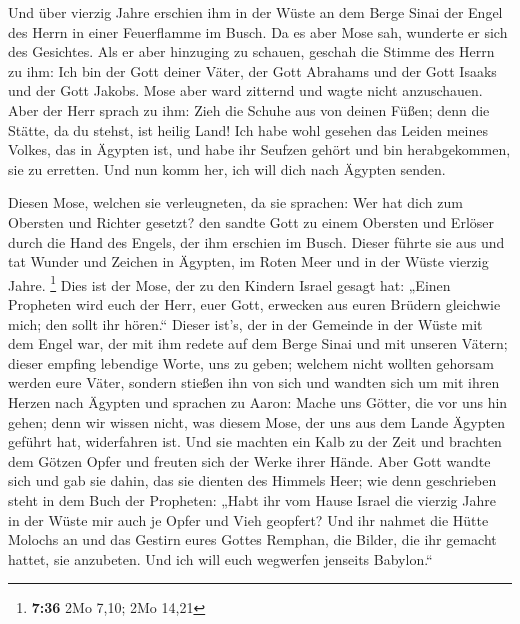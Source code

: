  Und über vierzig Jahre erschien ihm in der Wüste an dem
Berge Sinai der Engel des Herrn in einer Feuerflamme im Busch.
 Da es aber Mose sah, wunderte er sich des Gesichtes. Als
er aber hinzuging zu schauen, geschah die Stimme des Herrn zu ihm:
 Ich bin der Gott deiner Väter, der Gott Abrahams und der
Gott Isaaks und der Gott Jakobs. Mose aber ward zitternd und wagte nicht
anzuschauen.  Aber der Herr sprach zu ihm: Zieh die Schuhe
aus von deinen Füßen; denn die Stätte, da du stehst, ist heilig Land!
 Ich habe wohl gesehen das Leiden meines Volkes, das in
Ägypten ist, und habe ihr Seufzen gehört und bin herabgekommen, sie zu
erretten. Und nun komm her, ich will dich nach Ägypten senden.

 Diesen Mose, welchen sie verleugneten, da sie sprachen:
Wer hat dich zum Obersten und Richter gesetzt? den sandte Gott zu einem
Obersten und Erlöser durch die Hand des Engels, der ihm erschien im
Busch.  Dieser führte sie aus und tat Wunder und Zeichen in
Ägypten, im Roten Meer und in der Wüste vierzig Jahre. \footnote{\textbf{7:36}
  2Mo 7,10; 2Mo 14,21}  Dies ist der Mose, der zu den
Kindern Israel gesagt hat: „Einen Propheten wird euch der Herr, euer
Gott, erwecken aus euren Brüdern gleichwie mich; den sollt ihr hören.``
 Dieser ist's, der in der Gemeinde in der Wüste mit dem
Engel war, der mit ihm redete auf dem Berge Sinai und mit unseren
Vätern; dieser empfing lebendige Worte, uns zu geben; 
welchem nicht wollten gehorsam werden eure Väter, sondern stießen ihn
von sich und wandten sich um mit ihren Herzen nach Ägypten 
und sprachen zu Aaron: Mache uns Götter, die vor uns hin gehen; denn wir
wissen nicht, was diesem Mose, der uns aus dem Lande Ägypten geführt
hat, widerfahren ist.  Und sie machten ein Kalb zu der Zeit
und brachten dem Götzen Opfer und freuten sich der Werke ihrer Hände.
 Aber Gott wandte sich und gab sie dahin, das sie dienten
des Himmels Heer; wie denn geschrieben steht in dem Buch der Propheten:
„Habt ihr vom Hause Israel die vierzig Jahre in der Wüste mir auch je
Opfer und Vieh geopfert?  Und ihr nahmet die Hütte Molochs
an und das Gestirn eures Gottes Remphan, die Bilder, die ihr gemacht
hattet, sie anzubeten. Und ich will euch wegwerfen jenseits Babylon.``

